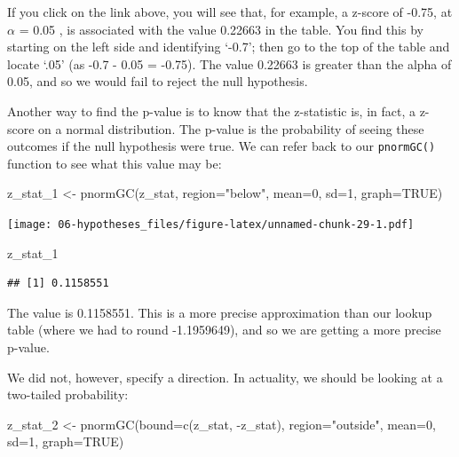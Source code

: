 \documentclass[
]{book}
\newenvironment{Shaded}{\begin{snugshade}}{\end{snugshade}}
\newcommand{\AttributeTok}[1]{\textcolor[rgb]{0.77,0.63,0.00}{#1}}
\newcommand{\ConstantTok}[1]{\textcolor[rgb]{0.00,0.00,0.00}{#1}}
\newcommand{\DecValTok}[1]{\textcolor[rgb]{0.00,0.00,0.81}{#1}}
\newcommand{\FunctionTok}[1]{\textcolor[rgb]{0.00,0.00,0.00}{#1}}
\newcommand{\NormalTok}[1]{#1}
\newcommand{\OtherTok}[1]{\textcolor[rgb]{0.56,0.35,0.01}{#1}}
\newcommand{\SpecialCharTok}[1]{\textcolor[rgb]{0.00,0.00,0.00}{#1}}
\newcommand{\StringTok}[1]{\textcolor[rgb]{0.31,0.60,0.02}{#1}}
\begin{document}
If you click on the link above, you will see that, for example, a z-score of -0.75, at \(\alpha\) = 0.05 , is associated with the value 0.22663 in the table. You find this by starting on the left side and identifying `-0.7'; then go to the top of the table and locate `.05' (as -0.7 - 0.05 = -0.75). The value 0.22663 is greater than the alpha of 0.05, and so we would fail to reject the null hypothesis.

Another way to find the p-value is to know that the z-statistic is, in fact, a z-score on a normal distribution. The p-value is the probability of seeing these outcomes if the null hypothesis were true. We can refer back to our \texttt{pnormGC()} function to see what this value may be:

\begin{Shaded}
\begin{Highlighting}[]
\NormalTok{z\_stat\_1 }\OtherTok{\textless{}{-}} \FunctionTok{pnormGC}\NormalTok{(z\_stat, }\AttributeTok{region=}\StringTok{"below"}\NormalTok{, }\AttributeTok{mean=}\DecValTok{0}\NormalTok{, }\AttributeTok{sd=}\DecValTok{1}\NormalTok{, }\AttributeTok{graph=}\ConstantTok{TRUE}\NormalTok{) }
\end{Highlighting}
\end{Shaded}

\texttt{[image: 06-hypotheses\_files/figure-latex/unnamed-chunk-29-1.pdf]}

\begin{Shaded}
\begin{Highlighting}[]
\NormalTok{z\_stat\_1}
\end{Highlighting}
\end{Shaded}

\begin{verbatim}
## [1] 0.1158551
\end{verbatim}

The value is 0.1158551. This is a more precise approximation than our lookup table (where we had to round -1.1959649), and so we are getting a more precise p-value.

We did not, however, specify a direction. In actuality, we should be looking at a two-tailed probability:

\begin{Shaded}
\begin{Highlighting}[]
\NormalTok{z\_stat\_2 }\OtherTok{\textless{}{-}} \FunctionTok{pnormGC}\NormalTok{(}\AttributeTok{bound=}\FunctionTok{c}\NormalTok{(z\_stat, }\SpecialCharTok{{-}}\NormalTok{z\_stat), }\AttributeTok{region=}\StringTok{"outside"}\NormalTok{, }\AttributeTok{mean=}\DecValTok{0}\NormalTok{, }\AttributeTok{sd=}\DecValTok{1}\NormalTok{, }\AttributeTok{graph=}\ConstantTok{TRUE}\NormalTok{) }
\end{Highlighting}
\end{Shaded}
\end{document}
